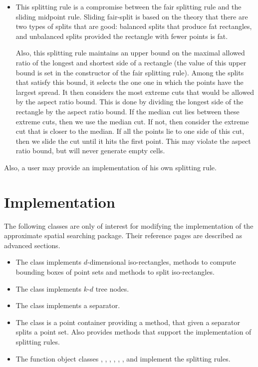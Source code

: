 \begin{itemize}
\item {}

This splitting rule is a compromise between the fair splitting rule
and the sliding midpoint rule.
Sliding fair-split is based on the theory that there are
two types of splits that are good: balanced splits that
produce fat rectangles, and unbalanced splits provided
the rectangle with fewer points is fat.

Also, this splitting rule maintains an upper
bound on the maximal allowed ratio of the longest and shortest side of
a rectangle (the value of this upper bound is set in the constructor of the
fair splitting rule). Among the splits that satisfy this bound, it selects
the one one in which the points have the largest spread.
It then considers the most extreme cuts that would be allowed by the
aspect ratio bound. This is done by dividing the longest side of
the rectangle by the aspect ratio bound. If the median cut lies
between these extreme cuts, then we use the median cut. If not,
then consider the extreme cut that is closer to the median.
If all the points lie to one side of this cut, then we slide the cut
until it hits the first point.
This may violate the aspect ratio bound, but will never generate empty cells.

\end{itemize}

Also, a user may provide an implementation of his own
splitting rule.

\section{Implementation}

The following classes are only of interest for modifying the implementation of the
approximate spatial searching package. Their reference pages are described as advanced sections.

\begin{itemize}

\item
The class  implements $d$-dimensional iso-rectangles, 
methods to compute bounding boxes
of point sets and methods to split iso-rectangles.

\item
The class  implements $k$-$d$ tree nodes.

\item
The class  implements a separator.

\item 
The class  is a point container providing a method, that given a separator
splits a point set. Also  provides methods that support the implementation
of splitting rules.

\item
The function object classes , ,
, , , ,
 and  implement the splitting rules.

\end{itemize}
